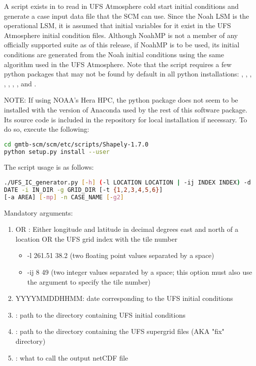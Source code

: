 A script exists in  to read in UFS Atmosphere cold start initial conditions and generate a case input data file that the SCM can use. Since the Noah LSM is the operational LSM, it is assumed that initial variables for it exist in the UFS Atmosphere initial condition files. Although NoahMP is not a member of any officially supported suite as of this release, if NoahMP is to be used, its initial conditions are generated from the Noah initial conditions using the same algorithm used in the UFS Atmosphere. Note that the script requires a few python packages that may not be found by default in all python installations: , , , , , , , and . 

NOTE: If using NOAA's Hera HPC, the  python package does not seem to be installed with the version of Anaconda used by the rest of this software package. Its source code is included in the repository for local installation if necessary. To do so, execute the following:
\begin{lstlisting}[language=bash]
cd gmtb-scm/scm/etc/scripts/Shapely-1.7.0
python setup.py install --user
\end{lstlisting}

The  script usage is as follows:

\begin{lstlisting}[language=bash]
./UFS_IC_generator.py [-h] (-l LOCATION LOCATION | -ij INDEX INDEX) -d
DATE -i IN_DIR -g GRID_DIR [-t {1,2,3,4,5,6}]
[-a AREA] [-mp] -n CASE_NAME [-g2]
\end{lstlisting}

Mandatory arguments:
\begin{enumerate}
\item {} OR :  Either longitude and latitude in decimal degrees east and north of a location OR the UFS grid index with the tile number
	\begin{itemize}
		\item -l 261.51 38.2 (two floating point values separated by a space)
		\item -ij 8 49 (two integer values separated by a space; this option must also use the  argument to specify the tile number)
	\end{itemize}
\item {} YYYYMMDDHHMM: date corresponding to the UFS initial conditions
\item {}: path to the directory containing UFS initial conditions
\item {}: path to the directory containing the UFS supergrid files (AKA "fix" directory)
\item {}: what to call the output netCDF file
\end{enumerate}


